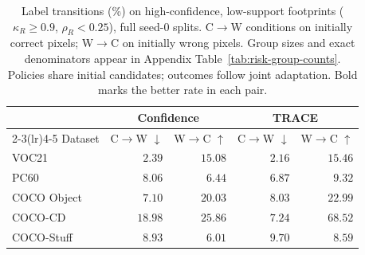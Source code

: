 \begin{table}[!t]
\caption{Label transitions (\%) on high-confidence, low-support footprints ($\kappa_R\geq0.9$, $\rho_R<0.25$), full seed-0 splits. C$\to$W conditions on initially correct pixels; W$\to$C on initially wrong pixels. Group sizes and exact denominators appear in Appendix Table~\ref{tab:risk-group-counts}. Policies share initial candidates; outcomes follow joint adaptation. Bold marks the better rate in each pair.}
\label{tab:update-risk}
\centering\small
\begin{tabular}{@{}lrrrr@{}}
\toprule
 & \multicolumn{2}{c}{Confidence} & \multicolumn{2}{c}{TRACE} \\
\cmidrule(lr){2-3}\cmidrule(lr){4-5}
Dataset & C$\to$W $\downarrow$ & W$\to$C $\uparrow$ & C$\to$W $\downarrow$ & W$\to$C $\uparrow$ \\
\midrule
VOC21 & $2.39$ & $15.08$ & $\mathbf{2.16}$ & $\mathbf{15.46}$ \\
PC60 & $8.06$ & $6.44$ & $\mathbf{6.87}$ & $\mathbf{9.32}$ \\
COCO Object & $\mathbf{7.10}$ & $20.03$ & $8.03$ & $\mathbf{22.99}$ \\
COCO-CD & $18.98$ & $25.86$ & $\mathbf{7.24}$ & $\mathbf{68.52}$ \\
COCO-Stuff & $\mathbf{8.93}$ & $6.01$ & $9.70$ & $\mathbf{8.59}$ \\
\bottomrule
\end{tabular}
\end{table}
